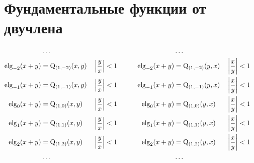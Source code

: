 
\section{Фундаментальные функции от двучлена}

\begin{equation*} \begin{aligned}
&\ldots &&&&& &\ldots \\
%
\elg_{-2}(x + y) &= \mathrm{Q}_{(1,-2)}(x, y) &
&\left| \frac{y}{x} \right| < 1 &
&\quad &
\elg_{-2}(x + y) &= \mathrm{Q}_{(1,-2)}(y, x) & 
&\left| \frac{x}{y} \right| < 1 \\
%
\elg_{-1}(x + y) &= \mathrm{Q}_{(1,-1)}(x, y) & 
&\left| \frac{y}{x} \right| < 1 &
&\quad &
\elg_{-1}(x + y) &= \mathrm{Q}_{(1,-1)}(y, x) & 
&\left| \frac{x}{y} \right| < 1 \\
%
\elg_0(x + y) &= \mathrm{Q}_{(1,0)}(x, y) & 
&\left| \frac{y}{x} \right| < 1 &
&\quad &
\elg_0(x + y) &= \mathrm{Q}_{(1,0)}(y, x) & 
&\left| \frac{x}{y} \right| < 1 \\
%
\elg_1(x + y) &= \mathrm{Q}_{(1,1)}(x, y) & 
&\left| \frac{y}{x} \right| < 1 &
&\quad &
\elg_1(x + y) &= \mathrm{Q}_{(1,1)}(y, x) & 
&\left| \frac{x}{y} \right| < 1 \\
%
\elg_2(x + y) &= \mathrm{Q}_{(1,2)}(x, y) & 
&\left| \frac{y}{x} \right| < 1 &
&\quad &
\elg_2(x + y) &= \mathrm{Q}_{(1,2)}(y, x) & 
&\left| \frac{x}{y} \right| < 1 \\
%
&\ldots &&&&& &\ldots \\
\end{aligned} \end{equation*}